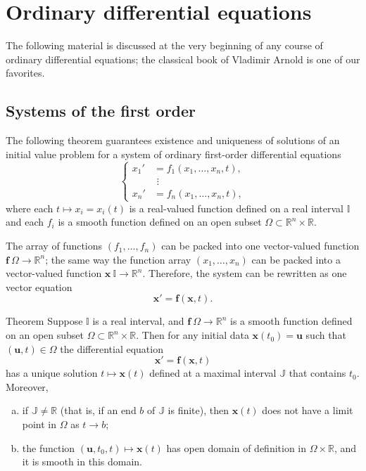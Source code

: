 \section{Ordinary differential equations}

The following material is discussed at the very beginning of any course of ordinary differential equations; the classical book of Vladimir Arnold \cite{arnold} is one of our favorites.


\subsection*{Systems of the first order}

The following theorem guarantees existence and uniqueness of solutions of an initial value problem
for a system of ordinary first-order differential equations
\[
\begin{cases}
x_1'&=f_1(x_1,\dots,x_n,t),
\\
&\,\,\vdots
\\
x_n'&=f_n(x_1,\dots,x_n,t),
\end{cases}
\]
where each $t\mapsto x_i=x_i(t)$ is a real-valued function defined on a real interval $\mathbb{I}$
and each $f_i$ is a smooth function defined on an open subset $\Omega\subset \mathbb{R}^n\times \mathbb{R}$.

The array of functions $(f_1,\dots,f_n)$ can be packed into one vector-valued function 
$\bm{f}\:\Omega\to \mathbb{R}^n$;
the same way the function array $(x_1,\dots,x_n)$ can be packed into a vector-valued function  $\bm{x}\:\mathbb{I}\to\mathbb{R}^n$.
Therefore, the system can be rewritten as one vector equation 
\[\bm{x}'=\bm{f}(\bm{x}, t).\] 

\begin{thm}{Theorem}\label{thm:ODE}
Suppose $\mathbb{I}$ is a real interval, and $\bm{f}\:\Omega\to \mathbb{R}^n$ is a smooth function defined on an open subset $\Omega\subset \mathbb{R}^n\times \mathbb{R}$.
Then for any initial data $\bm{x}(t_0)=\bm{u}$ such that $(\bm{u},t)\in\Omega$ the differential equation 
\[\bm{x}'=\bm{f}(\bm{x},t)\]
has a unique solution $t\mapsto \bm{x}(t)$ defined at a maximal interval $\mathbb{J}$ that contains $t_0$.
Moreover,
\begin{enumerate}[(a)]
\item  if $\mathbb{J}\ne \mathbb{R}$ (that is, if an end $b$ of $\mathbb{J}$ is finite), then $\bm{x}(t)$ does not have a limit point in $\Omega$ as $t\to b$;
\item  the function $(\bm{u},t_0,t)\mapsto \bm{x}(t)$ has open domain of definition in $\Omega\times \mathbb{R}$, and it is smooth in this domain.
\end{enumerate}

\end{thm}

